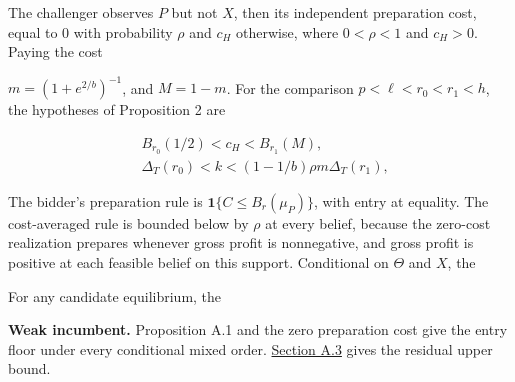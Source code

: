 
The challenger observes \(P\) but not \(X\), then its independent
preparation cost, equal to \(0\) with probability \(\rho\) and \(c_H\)
otherwise, where \(0<\rho<1\) and \(c_H>0\). Paying the cost

\(m=(1+e^{2/b})^{-1}\), and \(M=1-m\). For the comparison
\(p<\ell<r_0<r_1<h\), the hypotheses of Proposition 2 are

\[
\begin{aligned}
&B_{r_0}(1/2)<c_H<B_{r_1}(M),\\
&\Delta_T(r_0)<k<(1-1/b)\rho m\Delta_T(r_1),
\end{aligned}
\tag{OA.1}\label{eq:oa-oa-1}
\]

The bidder's preparation rule is \(\mathbf1\{C\le B_r(\mu_P)\}\), with
entry at equality. The cost-averaged rule is
bounded below by \(\rho\) at every belief, because the zero-cost
realization prepares whenever gross profit is nonnegative, and gross
profit is positive at each feasible belief on this support. Conditional on \(\Theta\) and \(X\), the

For any candidate equilibrium, the

\textbf{Weak incumbent.} Proposition A.1 and the zero preparation cost give the entry floor
under every conditional mixed order. \hyperref[oa-a-inference]{Section
A.3} gives the residual upper bound.

